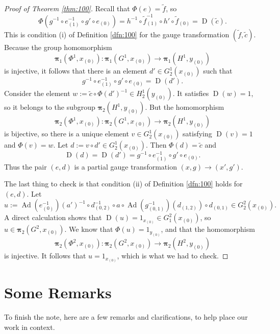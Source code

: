 \documentclass[a4paper,10pt]{amsart}
\theoremstyle{definition}
\numberwithin{equation}{section}
\newcommand{\opn}{\operatorname}
\newcommand{\tup}[1]{\textup{#1}}
\newcommand{\bsym}[1]{\boldsymbol{#1}}
\newcommand{\til}[1]{\tilde{#1}}
\begin{document}
\begin{proof}[Proof of Theorem \tup{\ref{thm:100}}]
Recall that $\Phi(e) = \til{f}$, so  
\[ \Phi(g^{-1} \circ e_{(1)}^{-1} \circ g' \circ e_{(0)}) = 
h^{-1} \circ \til{f}_{(1)}^{-1} \circ h' \circ \til{f}_{(0)} =
\opn{D}(\til{c}) . \]
This is condition (i) of Definition \ref{dfn:100} for the gauge transformation 
$(\til{f}, \til{c})$.
Because the group homomorphism 
\[  \bsym{\pi}_1(\Phi^1, x_{(0)}) : 
\bsym{\pi}_1(G^1, x_{(0)}) \to
\bsym{\pi}_1 ( H^1, y_{(0)}) \]
is injective, it follows that there is an element 
$d' \in G^1_2(x_{(0)})$ such that 
\[ g^{-1} \circ e_{(1)}^{-1} \circ g' \circ e_{(0)} = \opn{D}(d') . \]
Consider the element 
$w := \til{c} \circ \Phi(d')^{-1} \in H^1_2(y_{(0)})$. 
It satisfies $\opn{D}(w) = 1$, so it belongs to the subgroup 
$\bsym{\pi}_2(H^1, y_{(0)})$. But the homomorphism 
\[ \bsym{\pi}_2(\Phi^1, x_{(0)}) : 
\bsym{\pi}_2(G^1, x_{(0)}) \to
\bsym{\pi}_2 ( H^1, y_{(0)}) \]
is bijective, so there is a unique element 
$v \in G^1_2(x_{(0)})$ satisfying $\opn{D}(v) = 1$ and 
$\Phi(v) = w$.
Let $d := v \circ d' \in G^1_2(x_{(0)})$.
Then $\Phi(d) = \til{c}$ and
\[ \opn{D}(d) = \opn{D}(d') = g^{-1} \circ e_{(1)}^{-1} \circ g' \circ e_{(0)}
. \]
Thus the pair $(e, d)$ is a partial gauge transformation 
$(x, g) \to (x', g')$. 

The last thing to check is that condition (ii) of Definition \ref{dfn:100}
holds for $(e, d)$. Let 
\[ u := \opn{Ad}(e_{(0)}^{-1})(a')^{-1} \circ    
d_{(0, 2)}^{-1} \circ a \circ 
\opn{Ad}(g_{(0, 1)}^{-1})(d_{(1, 2)}) \circ d_{(0, 1)}
\in  G^2_2(x_{(0)}) . \]
A direct calculation shows that 
$\opn{D}(u) = 1_{x_{(0)}} \in G^2_1(x_{(0)})$, so 
$u \in \bsym{\pi}_2(G^2, x_{(0)})$. 
We know that $\Phi(u) = 1_{y_{(0)}}$, and that the homomorphism 
\[ \bsym{\pi}_2(\Phi^2 ,x_{(0)}) : \bsym{\pi}_2(G^2 ,x_{(0)}) \to
\bsym{\pi}_2(H^2 ,y_{(0)}) \] 
is injective. It follows that $u = 1_{x_{(0)}}$, which is
what we had to check.
\end{proof}





\section{Some Remarks}
\label{sec:remarks}

To finish the note, here are a few remarks and clarifications, to help place
our work in context. 
\end{document}
